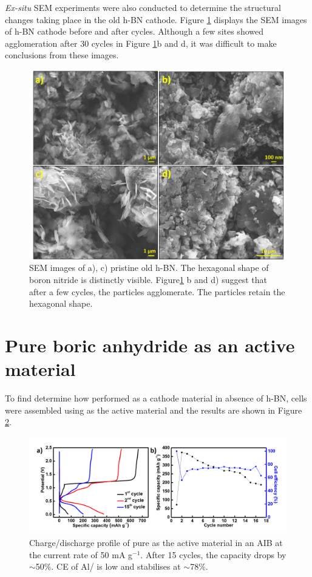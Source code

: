 \textit{Ex-situ} SEM experiments were also conducted to determine the structural changes taking place in the old h-BN cathode. Figure \ref{Figures/BOhBN:hBNSEM} displays the SEM images of h-BN cathode before and after cycles. Although a few sites showed agglomeration after 30 cycles in Figure \ref{Figures/BOhBN:hBNSEM}b and d, it was difficult to make conclusions from these images.

\begin{figure}[tbh!]
\centering
\includegraphics[width=\textwidth]{Figures/BOhBN/hBNSEM}
\caption{SEM images of a), c) pristine old h-BN. The hexagonal shape of boron nitride is distinctly visible. Figure\ref{Figures/BOhBN:hBNSEM} b and d) suggest that after a few cycles, the particles agglomerate. The particles retain the hexagonal shape.}
\label{Figures/BOhBN:hBNSEM}
\end{figure}



\section*{Pure boric anhydride  as an active material}
To find determine how  performed as a cathode material in absence of h-BN, cells were assembled using  as the active material and the results are shown in Figure \ref{Figures/BOhBN:BOCDC}. 

\begin{figure}[tbh!]
\centering
\includegraphics[width=\textwidth]{Figures/BOhBN/BOCDC}
\caption{Charge/discharge profile of pure  as the active material in an AIB at the current rate of 50 mA g$^{-1}$. After 15 cycles, the capacity drops by $\sim$50\%. CE of Al/ is low and  stabilises at $\sim$78\%.}
\label{Figures/BOhBN:BOCDC}
\end{figure}

